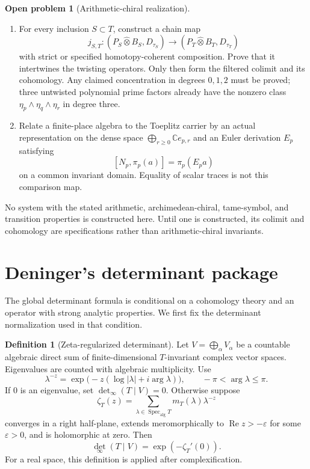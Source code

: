 \documentclass[11pt]{article}
\theoremstyle{plain}
\theoremstyle{definition}
\newtheorem{definition}[theorem]{Definition}
\newtheorem{openproblem}[theorem]{Open problem}
\theoremstyle{remark}
\begin{document}
\begin{openproblem}[Arithmetic-chiral realization]
\begin{enumerate}
\item For every inclusion \(S\subset T\), construct a chain map
\[
 j_{S,T}:(P_S\widehat\otimes B_S,D_{\tau_S})
 \longrightarrow(P_T\widehat\otimes B_T,D_{\tau_T})
\]
with strict or specified homotopy-coherent composition.  Prove that it
intertwines the twisting operators.  Only then form the filtered colimit
and its cohomology.  Any claimed concentration in degrees \(0,1,2\) must
be proved; three untwisted polynomial prime factors already have the
nonzero class \(\eta_p\wedge\eta_q\wedge\eta_r\) in degree three.

\item Relate a finite-place algebra to the Toeplitz carrier by an actual
representation on the dense space \(\bigoplus_{r\geq0}\mathbb C e_{p,r}\)
and an Euler derivation \(E_p\) satisfying
\[
 [N_p,\pi_p(a)]=\pi_p(E_pa)
\]
on a common invariant domain.  Equality of scalar traces is not this
comparison map.
\end{enumerate}

No system with the stated arithmetic, archimedean-chiral, tame-symbol, and
transition properties is constructed here.  Until one is constructed, its
colimit and cohomology are specifications rather than arithmetic-chiral
invariants.
\end{openproblem}

\section{Deninger's determinant package}

The global determinant formula is conditional on a cohomology theory and
an operator with strong analytic properties.  We first fix the determinant
normalization used in that condition.

\begin{definition}[Zeta-regularized determinant]
\label{def:det}
Let \(V=\bigoplus_\alpha V_\alpha\) be a countable algebraic direct sum of
finite-dimensional \(T\)-invariant complex vector spaces.  Eigenvalues are
counted with algebraic multiplicity.  Use
\[
 \lambda^{-z}=\exp\!\bigl(-z(\log|\lambda|+i\arg\lambda)\bigr),
 \qquad -\pi<\arg\lambda\leq\pi.
\]
If \(0\) is an eigenvalue, set \(\det_\infty(T\mid V)=0\).  Otherwise
suppose
\[
 \zeta_T(z)=\sum_{\lambda\in\operatorname{Spec}_{\mathrm{alg}}T}
 m_T(\lambda)\lambda^{-z}
\]
converges in a right half-plane, extends meromorphically to
\(\operatorname{Re}z>-\varepsilon\) for some \(\varepsilon>0\), and is
holomorphic at zero.  Then
\[
 \det_\infty(T\mid V)=\exp(-\zeta_T'(0)).
\]
For a real space, this definition is applied after complexification.
\end{definition}
\end{document}
